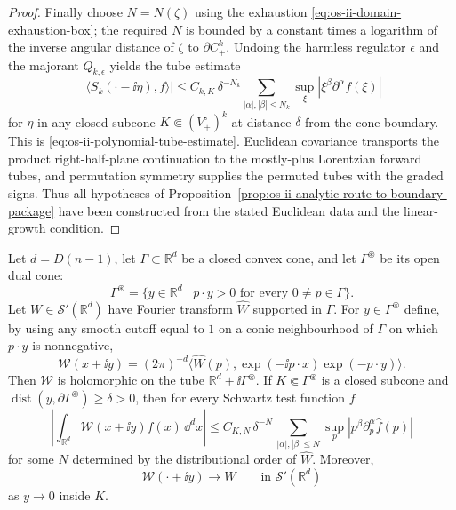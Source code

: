 \begin{proof}
Finally choose \(N=N(\zeta)\) using the exhaustion
\eqref{eq:os-ii-domain-exhaustion-box}; the required \(N\) is bounded by a
constant times a logarithm of the inverse angular distance of \(\zeta\) to
\(\partial C_+^k\).  Undoing the harmless regulator \(\epsilon\) and the
majorant \(Q_{k,\epsilon}\) yields the tube estimate
\[
  |\langle S_k(\cdot-\ii\eta),f\rangle|
  \le
  C_{k,K}\,\delta^{-N_k}
  \sum_{|\alpha|,|\beta|\le N_k}
    \sup_\xi |\xi^\beta\partial^\alpha f(\xi)|
\]
for \(\eta\) in any closed subcone \(K\Subset(V_+^\circ)^k\) at distance
\(\delta\) from the cone boundary.  This is
\eqref{eq:os-ii-polynomial-tube-estimate}.  Euclidean covariance transports
the product right-half-plane continuation to the mostly-plus Lorentzian
forward tubes, and
permutation symmetry supplies the permuted tubes with the graded signs.
Thus all hypotheses of
Proposition~\ref{prop:os-ii-analytic-route-to-boundary-package} have been
constructed from the stated Euclidean data and the linear-growth condition.
\end{proof}

\begin{proposition}
\label{prop:fourier-laplace-tempered-boundary-values}
Let \(d=D(n-1)\), let \(\Gamma\subset\mathbb R^d\) be a closed convex cone,
and let \(\Gamma^\circledast\) be its open dual cone:
\[
  \Gamma^\circledast
  =
  \{y\in\mathbb R^d\mid p\cdot y>0
    \text{ for every }0\ne p\in\Gamma\}.
\]
Let \(W\in\mathcal S'(\mathbb R^d)\) have Fourier transform
\(\widehat W\) supported in \(\Gamma\).  For \(y\in\Gamma^\circledast\)
define, by using any smooth cutoff equal to \(1\) on a conic neighbourhood of
\(\Gamma\) on which \(p\cdot y\) is nonnegative,
\begin{equation}
  \mathcal W(x+\ii y)
  =
  (2\pi)^{-d}
  \bigl\langle \widehat W(p),
    \exp(-\ii p\cdot x)\exp(-p\cdot y)\bigr\rangle .
  \label{eq:fourier-laplace-tube-transform}
\end{equation}
Then \(\mathcal W\) is holomorphic on the tube
\(\mathbb R^d+\ii\Gamma^\circledast\).  If \(K\Subset\Gamma^\circledast\)
is a closed subcone and \(\operatorname{dist}(y,\partial\Gamma^\circledast)
\ge\delta>0\), then for every Schwartz test function \(f\)
\[
  \left|
    \int_{\mathbb R^d}\mathcal W(x+\ii y) f(x)\,\dd^dx
  \right|
  \le
  C_{K,N}\,\delta^{-N}\,
  \sum_{|\alpha|,|\beta|\le N}
    \sup_p |p^\beta\partial_p^\alpha\widehat f(p)|
\]
for some \(N\) determined by the distributional order of \(\widehat W\).
Moreover,
\[
  \mathcal W(\cdot+\ii y)\longrightarrow W
  \qquad\text{in }\mathcal S'(\mathbb R^d)
\]
as \(y\to0\) inside \(K\).
\end{proposition}

